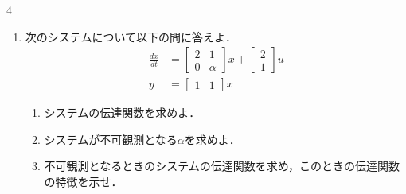 \documentclass[fleqn]{article}
\renewcommand{\bmatrix}{\left[\begin{array}}
\newcommand{\ematrix}{\end{array}\right]}
\begin{document}
\begin{multicols}{4}
\begin{enumerate}
\begin{enumerate}
\item
$(m_0, m_1, m_2, k_1, k_2)=(1,1,2,1,2)$の場合，可制御であるか否かを判断せよ．
\vspace{10cm}

\end{enumerate}

\item
次のシステムについて以下の問に答えよ．
\begin{align}
	\frac{dx}{dt}
	&=	\bmatrix{cc}
			2 & 1 \\
			0 & \alpha
		\ematrix
		x
		+
		\bmatrix{c}
			2 \\
			1
		\ematrix
		u
\nonumber \\
	y 
	&=	\bmatrix{cc}
			1 & 1
		\ematrix
		x
\nonumber 
\end{align}

\begin{enumerate}

\item 
システムの伝達関数を求めよ．
\vspace{4cm}

\item
システムが不可観測となる$\alpha$を求めよ．
\vspace{3cm}

\item
不可観測となるときのシステムの伝達関数を求め，このときの伝達関数の特徴を示せ．
\vspace{4cm}

\end{enumerate}






\end{enumerate}
\end{multicols}
\end{document}

